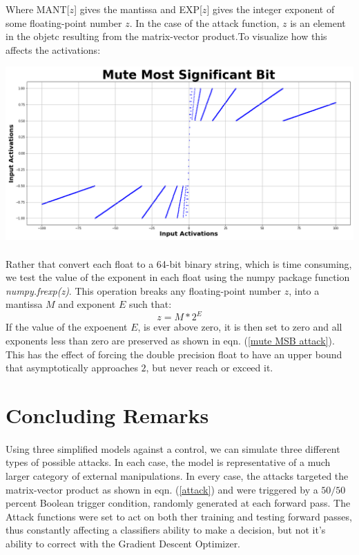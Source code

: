 \documentclass[12pt,letterpaper]{article}
\begin{document}
Where MANT[$z$] gives the mantissa and EXP[$z$] gives the integer exponent of some floating-point number $z$. In the case of the attack function, $z$ is an element in the objetc resulting from the matrix-vector product.To visualize how this affects the activations:
\begin{center}
\includegraphics[scale=0.3]{Mute_Most_Significant_Bit}
\end{center}

\paragraph*{}Rather that convert each float to a 64-bit binary string, which is time consuming, we test the value of the exponent in each float using the numpy package function \textit{numpy.frexp(z)}. This operation breaks any floating-point number $z$, into a mantissa $M$ and exponent $E$ such that:
\begin{equation}
z = M * 2^{E}
\end{equation}
If the value of the expoenent $E$, is ever above zero, it is then set to zero and all exponents less than zero are preserved as shown in eqn. (\ref{mute MSB attack}). This has the effect of forcing the double precision float to have an upper bound that asymptotically approaches $2$, but never reach or exceed it.


\section*{Concluding Remarks}

\paragraph*{}Using three simplified models against a control, we can simulate three different types of possible attacks. In each case, the model is representative of a much larger category of external manipulations. In every case, the attacks targeted the matrix-vector product as shown in eqn. (\ref{attack}) and were triggered by a $50/50$ percent Boolean trigger condition, randomly generated at each forward pass. The Attack functions were set to act on both ther training and testing forward passes, thus constantly affecting a classifiers ability to make a decision, but not it's ability to correct with the Gradient Descent Optimizer.


\end{document}
